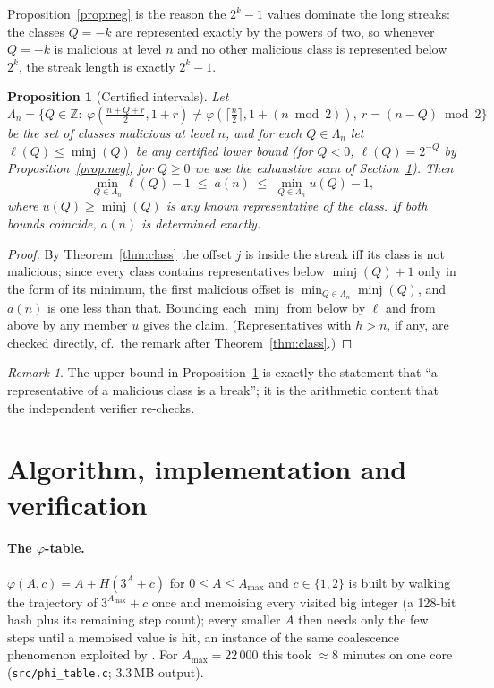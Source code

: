 \documentclass[11pt]{article}
\newtheorem{proposition}[theorem]{Proposition}
\theoremstyle{remark}
\newtheorem{remark}[theorem]{Remark}
\newcommand{\hh}{h}
\begin{document}
Proposition~\ref{prop:neg} is the reason the $2^k-1$ values dominate the long streaks: the classes
$Q=-k$ are represented exactly by the powers of two, so whenever $Q=-k$ is malicious at level $n$
and no other malicious class is represented below $2^{k}$, the streak length is exactly $2^{k}-1$.

\begin{proposition}[Certified intervals]\label{prop:interval}
Let
\[
\Lambda_n=\Big\{Q\in\mathbb{Z}:\ \varphi\!\left(\tfrac{n+Q+r}{2},1+r\right)\ne\varphi\!\left(\lceil\tfrac n2\rceil,1+(n\bmod 2)\right),\ r=(n-Q)\bmod2\Big\}
\]
be the set of classes malicious at level $n$, and for each $Q\in\Lambda_n$ let
$\ell(Q)\le\operatorname{minj}(Q)$ be any certified lower bound (for $Q<0$, $\ell(Q)=2^{-Q}$ by
Proposition~\ref{prop:neg}; for $Q\ge0$ we use the exhaustive scan of Section~\ref{sec:algo}).
Then
\[
\min_{Q\in\Lambda_n}\ell(Q)-1\;\le\;a(n)\;\le\;\min_{Q\in\Lambda_n}u(Q)-1,
\]
where $u(Q)\ge\operatorname{minj}(Q)$ is any known representative of the class.
If both bounds coincide, $a(n)$ is determined exactly.
\end{proposition}

\begin{proof}
By Theorem~\ref{thm:class} the offset $j$ is inside the streak iff its class is not malicious; since
every class contains representatives below $\operatorname{minj}(Q)+1$ only in the form of its minimum,
the first malicious offset is $\min_{Q\in\Lambda_n}\operatorname{minj}(Q)$, and $a(n)$ is one less than
that. Bounding each $\operatorname{minj}$ from below by $\ell$ and from above by any member $u$ gives
the claim. (Representatives with $\hh>n$, if any, are checked directly, cf.\ the remark after
Theorem~\ref{thm:class}.)
\end{proof}

\begin{remark}
The upper bound in Proposition~\ref{prop:interval} is exactly the statement that ``a representative of a
malicious class is a break''; it is the arithmetic content that the independent verifier re-checks.
\end{remark}

\section{Algorithm, implementation and verification}\label{sec:algo}

\paragraph{The $\varphi$-table.} $\varphi(A,c)=A+H(3^A+c)$ for $0\le A\le A_{\max}$ and $c\in\{1,2\}$ is
built by walking the trajectory of $3^{A_{\max}}+c$ once and memoising every visited big integer
(a 128-bit hash plus its remaining step count); every smaller $A$ then needs only the few steps until a
memoised value is hit, an instance of the same coalescence phenomenon exploited by
\cite{frinkle2025}. For $A_{\max}=22\,000$ this took $\approx8$ minutes on one core
(\texttt{src/phi\_table.c}; 3.3\,MB output).
\end{document}
